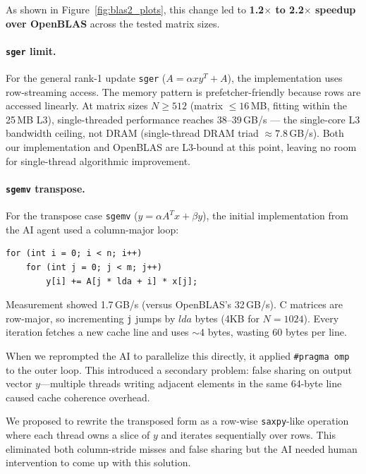 \documentclass[11pt,a4paper]{article}
\begin{document}
As shown in Figure~\ref{fig:blas2_plots}, this change led to \textbf{1.2$\times$ to 2.2$\times$ speedup over OpenBLAS} across the tested matrix sizes.

\paragraph{\texttt{sger} limit.}
For the general rank-1 update \texttt{sger} ($A = \alpha x y^T + A$), the implementation uses row-streaming access. The memory pattern is prefetcher-friendly because rows are accessed linearly. At matrix sizes $N \ge 512$ (matrix $\le 16$\,MB, fitting within the 25\,MB L3), single-threaded performance reaches 38--39\,GB/s — the single-core L3 bandwidth ceiling, not DRAM (single-thread DRAM triad $\approx 7.8$\,GB/s). Both our implementation and OpenBLAS are L3-bound at this point, leaving no room for single-thread algorithmic improvement.

\paragraph{\texttt{sgemv} transpose.}
For the transpose case \texttt{sgemv} ($y = \alpha A^T x + \beta y$), the initial implementation from the AI agent used a column-major loop:
\begin{lstlisting}[caption={Naive Transpose Loop}]
for (int i = 0; i < n; i++)
    for (int j = 0; j < m; j++)
        y[i] += A[j * lda + i] * x[j];
\end{lstlisting}
Measurement showed 1.7\,GB/s (versus OpenBLAS's 32\,GB/s). C matrices are row-major, so incrementing \texttt{j} jumps by $lda$ bytes (4KB for $N=1024$). Every iteration fetches a new cache line and uses $\sim$4 bytes, wasting 60 bytes per line.

When we reprompted the AI to parallelize this directly, it applied \texttt{\#pragma omp} to the outer loop. This introduced a secondary problem: false sharing on output vector $y$—multiple threads writing adjacent elements in the same 64-byte line caused cache coherence overhead.

We proposed to rewrite the transposed form as a row-wise \texttt{saxpy}-like operation where each thread owns a slice of $y$ and iterates sequentially over rows. This eliminated both column-stride misses and false sharing but the AI needed human intervention to come up with this solution.
\end{document}
